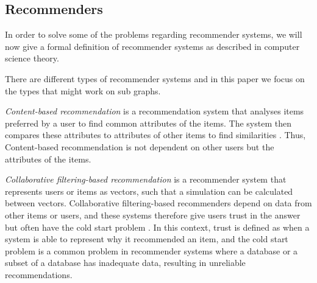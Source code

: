 \subsection{Recommenders}
In order to solve some of the problems regarding recommender systems, we will now give a formal definition of recommender systems as described in computer science theory.

There are different types of recommender systems and in this paper we focus on the types that might work on sub graphs.

\textit{Content-based recommendation} is a recommendation system that analyses items preferred by a user to find common attributes of the items. The system then compares these attributes to attributes of other items to find similarities \cite{lu2015recommender}. Thus, Content-based recommendation is not dependent on other users but the attributes of the items.

\textit{Collaborative filtering-based recommendation} is a recommender system that represents users or items as vectors, such that a simulation can be calculated between vectors. Collaborative filtering-based recommenders depend on data from other items or users, and these systems therefore give users trust in the answer but often have the cold start problem \cite{lu2015recommender}. In this context, trust is defined as when a system is able to represent why it recommended an item, and the cold start problem is a common problem in recommender systems where a database or a subset of a database has inadequate data, resulting in unreliable recommendations\cite{Ricci2015}.
